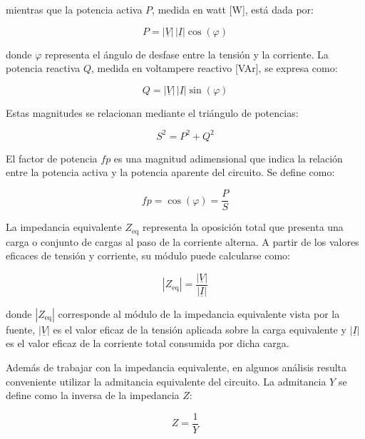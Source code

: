 mientras que la potencia activa $P$, medida en watt [W], está dada por:

\begin{equation}
P = |\underline{V}|\,|\underline{I}|\cos(\varphi)
\label{eq:potencia_activa}
\end{equation}

donde $\varphi$ representa el ángulo de desfase entre la tensión y la corriente. La potencia reactiva $Q$, medida en voltampere reactivo [VAr], se expresa como:

\begin{equation}
Q = |\underline{V}|\,|\underline{I}|\sin(\varphi)
\label{eq:potencia_reactiva}
\end{equation}

Estas magnitudes se relacionan mediante el triángulo de potencias:

\begin{equation}
S^2 = P^2 + Q^2
\label{eq:triangulo_potencias}
\end{equation}

El factor de potencia $fp$ es una magnitud adimensional que indica la relación entre la potencia activa y la potencia aparente del circuito. Se define como:

\begin{equation}
fp = \cos(\varphi) = \frac{P}{S}
\label{eq:factor_potencia}
\end{equation}


La impedancia equivalente $Z_{\text{eq}}$ representa la oposición total que presenta una carga o conjunto de cargas al paso de la corriente alterna. A partir de los valores eficaces de tensión y corriente, su módulo puede calcularse como:

\begin{equation}
|Z_{\text{eq}}| = \frac{|\underline{V}|}{|\underline{I}|}
\label{eq:impedancia_equivalente}
\end{equation}

donde $|Z_{\text{eq}}|$ corresponde al módulo de la impedancia equivalente vista por la fuente, $|\underline{V}|$ es el valor eficaz de la tensión aplicada sobre la carga equivalente y $|\underline{I}|$ es el valor eficaz de la corriente total consumida por dicha carga.

Además de trabajar con la impedancia equivalente, en algunos análisis resulta conveniente utilizar la admitancia equivalente del circuito. La admitancia $Y$ se define como la inversa de la impedancia $Z$:

\begin{equation}
Z=\frac{1}{Y}
\label{eq:impedancia_admitancia}
\end{equation}

